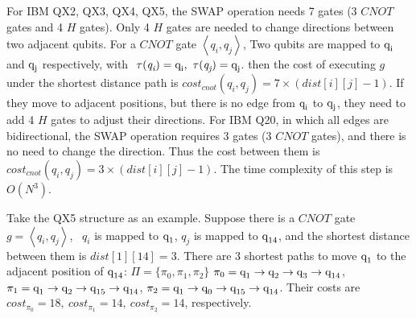 \documentclass[runningheads]{llncs}
\begin{document}
For IBM QX2, QX3, QX4, QX5, the SWAP operation needs 7 gates (3 $CNOT$ gates and 4 $H$ gates). Only 4 $H$ gates are needed to change directions between two adjacent qubits. For a $CNOT$ gate $\left \langle  \textit{q}_\textit{i},\textit{q}_\textit{j} \right \rangle $,
Two qubits are mapped to $\textup{q}_{\textup{i}}$ and $\textup{q}_{\textup{j}}$ respectively, with $\ \tau(\textit{q}_\textit{i})=\textup{q}_{\textup{i}},\ \tau(\textit{q}_\textit{j})=\textup{q}_{\textup{j}}$. then the cost of executing $g$ under the shortest distance path is $cost_{cnot}(\textit{q}_\textit{i},\textit{q}_\textit{j})=7 \times( dist[i][j]-1)$. If they move to adjacent positions, but there is no edge from $\textup{q}_{\textup{i}}$ to $\textup{q}_{\textup{j}}$, they need to add 4 $H$ gates to adjust their directions. For IBM Q20, in which all edges are bidirectional, the SWAP operation requires 3 gates (3 $CNOT$ gates), 
and there is no need to change the direction. Thus the cost between them is $cost_{cnot}(\textit{q}_\textit{i},\textit{q}_\textit{j})=3 \times( dist[i][j]-1)$. The time complexity of this step is $O (N^{3})$.
\begin{example}
	Take the QX5 structure as an example. Suppose there is a $CNOT$ gate $g=\left \langle  \textit{q}_\textit{i}, \textit{q}_\textit{j} \right \rangle $, \ $\textit{q}_\textit{i}$ is mapped to $\textup{q}_{1}$,  $\textit{q}_\textit{j}$ is mapped to $\textup{q}_{\textup{14}}$, and the shortest distance between them  is $dist[1][14]=3$. There are 3 shortest paths to move $\textup{q}_{\textup{1}}$ to the adjacent position of 
$\textup{q}_{\textup{14}}$:
$\Pi=\{\pi_{0},\pi_{1},\pi_{2}\}$
$\pi_{0}={\textup{q}_{\textup{1}}\rightarrow \textup{q}_{\textup{2}} \rightarrow \textup{q}_{\textup{3}} \rightarrow \textup{q}_{\textup{14}}}$,
$\pi_{1}={\textup{q}_{\textup{1}}\rightarrow \textup{q}_{\textup{2}} \rightarrow \textup{q}_{\textup{15}} \rightarrow \textup{q}_{\textup{14}}}$,
$\pi_{2}={\textup{q}_{\textup{1}}\rightarrow \textup{q}_{\textup{0}} \rightarrow \textup{q}_{\textup{15}} \rightarrow \textup{q}_{\textup{14}}}$.
Their costs are 
$cost_{\pi_{0}}=18,\ cost_{\pi_{1}}=14,\ cost_{\pi_{2}}=14$, respectively.
\end{example}
\end{document}
